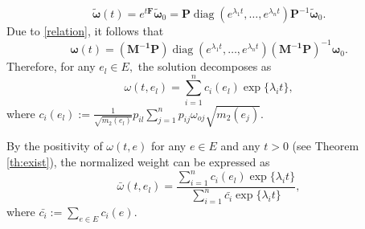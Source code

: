 \documentclass{article}
\begin{document}
\[
\bm{\tilde{\omega}}(t) =e^{t\textbf{\~{F}}}\bm{\tilde{\omega}}_0= \mathbf{P} \operatorname{diag}\left(e^{\lambda_1t}, \dots, e^{\lambda_{n}t}\right) \mathbf{P}^{-1} \bm{\tilde{\omega}}_0.
\]
Due to \eqref{relation}, it follows that
\[
\bm{\omega}(t) = (\mathbf{M^{-1}P})\operatorname{diag}\left(e^{\lambda_1t}, \dots, e^{\lambda_{n}t}\right) (\mathbf{M^{-1}P})^{-1} \bm{\omega}_0.
\]
Therefore, for any $e_l\in E,$
the solution decomposes as
\begin{equation}\label{solu}
    \omega(t,e_l) = \sum_{i=1}^{n}c_{i}(e_l) \exp\{\lambda_i t\},
\end{equation}
where $c_{i}(e_l):=\frac{1}{\sqrt{m_2(e_{l})}}p_{il}\sum_{j=1}^{n}p_{ij}\omega_{oj}\sqrt{m_2(e_j)}.$ 





By the positivity of $\omega(t,e)$ for any $e\in E$ and any $t>0$ (see Theorem \ref{th:exist}), the normalized weight can be expressed as
\begin{equation*}
   \bar{\omega}(t,e_l) = \frac{\sum_{i=1}^{n}c_{i}(e_l) \exp\{\lambda_{i} t\}}{\sum_{i=1}^{n}\bar{c_i}\exp\{\lambda_{i} t\}},
\end{equation*}  
where $\bar{c_i}:=\sum_{e\in E}c_i(e)$.
\end{document}
